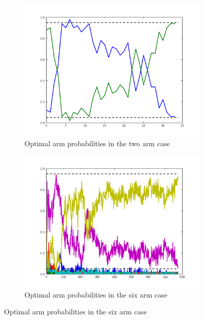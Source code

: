 \begin{figure}[h]
\centering

\begin{subfigure}[t]{.49\textwidth}
\centering
\includegraphics[width=\textwidth]{weights1.pdf}
\caption{Optimal arm probabilities in the two arm case}
\label{fig:weights1}
\end{subfigure}

\begin{subfigure}[t]{.49\textwidth}
\centering
\includegraphics[width=\textwidth]{weights2.pdf}
\caption{Optimal arm probabilities in the six arm case}
\label{fig:weights2}
\end{subfigure}
\end{figure}

